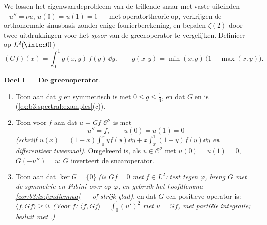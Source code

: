 \begin{problem}\label{pb:b3:spectral:1}
We lossen het eigenwaardeprobleem van de trillende snaar met
vaste uiteinden --- $-u'' = \nu u$, $u(0) = u(1) = 0$ --- met
operatortheorie op, verkrijgen de orthonormale sinusbasis zonder
enige fourierberekening, en bepalen $\zeta(2)$ door twee
uitdrukkingen voor het \emph{spoor} van de greenoperator te
vergelijken. Definieer op $L^2(\intcc01)$
\[
(Gf)(x) = \int_0^1 g(x,y)\,f(y)\,\dd y,
\qquad
g(x, y) = \min(x,y)\,\bigl(1 - \max(x,y)\bigr).
\]

\medskip
\noindent\textbf{Deel I --- De greenoperator.}
\begin{enumerate}
  \item Toon aan dat $g$  en symmetrisch is met $0 \leq g
        \leq \frac14$, en dat $G$  en  is
        (\cref{ex:b3:spectral:examples}(c)).
  \item Toon voor  $f$ aan dat $u = Gf$ $\mathcal C^2$ is
        met
        \[
        -u'' = f, \qquad u(0) = u(1) = 0
        \]
        \emph{(schrijf $u(x) = (1-x)\int_0^xyf(y)\dd y +
        x\int_x^1(1-y)f(y)\dd y$ en differentieer tweemaal)}.
        Omgekeerd is, als $u \in \mathcal C^2$ met $u(0) = u(1)
        = 0$, $G(-u'') = u$: $G$ inverteert de snaaroperator.
  \item Toon aan dat $\ker G = \{0\}$ \emph{(is $Gf = 0$ met $f
        \in L^2$: test tegen  $\varphi$, breng $G$ met de
        symmetrie en Fubini over op $\varphi$, en gebruik het
        hoofdlemma \cref{cor:b3:lp:fundlemma} --- of strijk
        glad)}, en dat $G$ een positieve operator is: $\langle f,
        Gf\rangle \geq 0$. \emph{(Voor  $f$: $\langle f,
        Gf\rangle = \int_0^1 (u')^2$ met $u = Gf$, met partiële
        integratie; besluit met .)}
\end{enumerate}


\end{problem}
